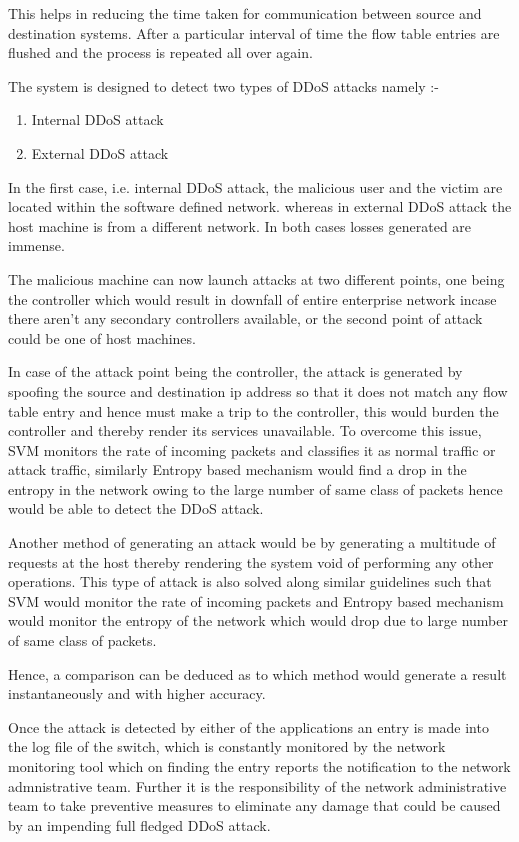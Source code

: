 \documentclass[12pt,a4paper,final]{report}
\begin{document}
This helps in reducing the time taken for communication between source and destination systems. After a particular interval of time the flow table entries are flushed and the process is repeated all over again.

The system is designed to detect two types of DDoS attacks namely :-
\begin{enumerate}
\item
Internal DDoS attack

\item
External DDoS attack
\end{enumerate}

In the first case, i.e. internal DDoS attack, the malicious user and the victim are located within the software defined network. 
whereas in external DDoS attack the host machine is from a different network. In both cases losses generated are immense.

The malicious machine can now launch attacks at two different points, one being the controller which would result in downfall of entire enterprise network incase there aren't any secondary controllers available, or the second point of attack could be one of host machines. 

In case of the attack point being the controller, the attack is generated by spoofing the source and destination ip address so that it does not match any flow table entry and hence must make a trip to the controller, this would burden the controller and thereby render its services unavailable. To overcome this issue, SVM monitors the rate of incoming packets and classifies it as normal traffic or attack traffic, similarly Entropy based mechanism would find a drop in the entropy in the network owing to the large number of same class of packets hence would be able to detect the DDoS attack.

Another method of generating an attack would be by generating a multitude of requests at the host thereby rendering the system void of performing any other operations. This type of attack is also solved along similar guidelines such that SVM would monitor the rate of incoming packets and Entropy based mechanism would monitor the entropy of the network which would drop due to large number of same class of packets.

Hence, a comparison can be deduced as to which method would generate a result instantaneously and with higher accuracy.

Once the attack is detected by either of the applications an entry is made into the log file of the switch, which is constantly monitored by the network monitoring tool which on finding the entry reports the notification to the network admnistrative team. Further it is the responsibility of the network administrative team to take preventive measures to eliminate any damage that could be caused by an impending full fledged DDoS attack.
\newline
\end{document}
